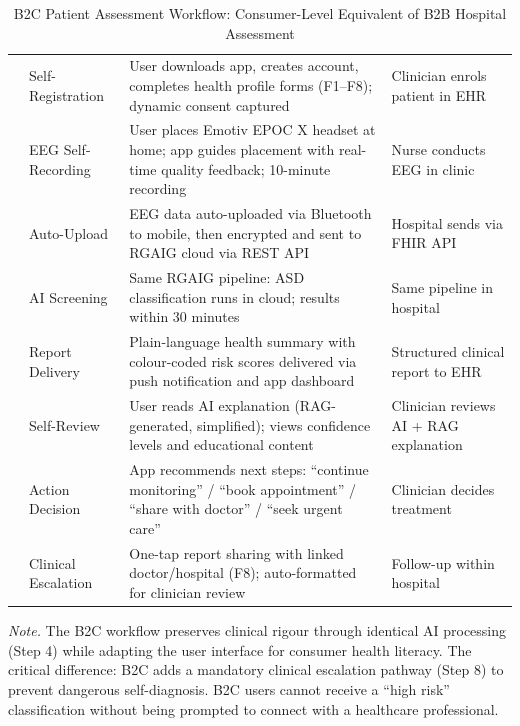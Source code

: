 {\tablestripes\tablefontsize

\begin{xltabular}{\textwidth}{@{} >{\raggedright\arraybackslash}p{1.0cm} >{\raggedright\arraybackslash}p{2.6cm} p{6.8cm} >{\raggedright\arraybackslash}p{3.7cm} @{}}
\caption[B2C Patient Assessment Workflow: Consumer-Level]{B2C Patient Assessment Workflow: Consumer-Level Equivalent of B2B Hospital Assessment}\label{tab:b2c_assessment_workflow} \\
\toprule
\thead{\#} &  &  &  \\
\midrule
\endfirsthead
\endhead
\bottomrule
{} & Self-Registration & User downloads app, creates account, completes health profile forms (F1--F8); dynamic consent captured & Clinician enrols patient in EHR \\
 & EEG Self-Recording & User places Emotiv EPOC X headset at home; app guides placement with real-time quality feedback; 10-minute recording & Nurse conducts EEG in clinic \\
 & Auto-Upload & EEG data auto-uploaded via Bluetooth to mobile, then encrypted and sent to RGAIG cloud via REST API & Hospital sends via FHIR API \\
 & AI Screening & Same RGAIG pipeline: ASD classification runs in cloud; results within 30 minutes & Same pipeline in hospital \\
 & Report Delivery & Plain-language health summary with colour-coded risk scores delivered via push notification and app dashboard & Structured clinical report to EHR \\
 & Self-Review & User reads AI explanation (RAG-generated, simplified); views confidence levels and educational content & Clinician reviews AI + RAG explanation \\
 & Action Decision & App recommends next steps: ``continue monitoring'' / ``book appointment'' / ``share with doctor'' / ``seek urgent care'' & Clinician decides treatment \\
 & Clinical Escalation & One-tap report sharing with linked doctor/hospital (F8); auto-formatted for clinician review & Follow-up within hospital \\
\end{xltabular}}
\vspace{0.5em}
\noindent\textit{Note.} The B2C workflow preserves clinical rigour through identical AI processing (Step 4) while adapting the user interface for consumer health literacy. The critical difference: B2C adds a mandatory clinical escalation pathway (Step 8) to prevent dangerous self-diagnosis. B2C users cannot receive a ``high risk'' classification without being prompted to connect with a healthcare professional.
\fi %

